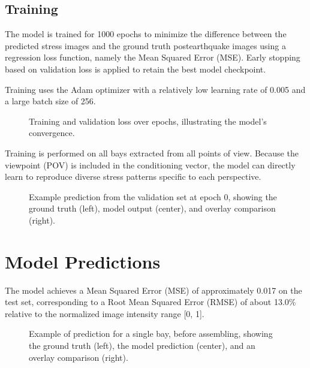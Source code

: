 \documentclass[letterpaper,10pt,english]{sphinxmanual}
\begin{document}
\section{Training}
\label{\detokenize{model:training}}
\sphinxAtStartPar
The model is trained for 1000 epochs to minimize the difference between the
predicted stress images and the ground truth post\sphinxhyphen{}earthquake images using a
regression loss function, namely the Mean Squared Error (MSE).
Early stopping based on validation loss is applied to retain the best model checkpoint.

\sphinxAtStartPar
Training uses the Adam optimizer with a relatively low learning rate of 0.005
and a large batch size of 256.

\begin{figure}[H]
\centering
\capstart

\noindent{}
\caption{Training and validation loss over epochs, illustrating the model’s convergence.}\label{\detokenize{model:id3}}\end{figure}

\sphinxAtStartPar
Training is performed on all bays extracted from all points of view.
Because the viewpoint (POV) is included in the conditioning vector, the model
can directly learn to reproduce diverse stress patterns specific to each
perspective.

\begin{figure}[H]
\centering
\capstart

\noindent{}
\caption{Example prediction from the validation set at epoch 0, showing the ground
truth (left), model output (center), and overlay comparison (right).}\label{\detokenize{model:id4}}\end{figure}

\sphinxstepscope


\chapter{Model Predictions}
\label{\detokenize{predictions:model-predictions}}\label{\detokenize{predictions:prediction-section}}\label{\detokenize{predictions::doc}}
\sphinxAtStartPar
The model achieves a Mean Squared Error (MSE) of approximately 0.017 on the
test set, corresponding to a Root Mean Squared Error (RMSE) of about 13.0\%
relative to the normalized image intensity range {[}0, 1{]}.

\begin{figure}[H]
\centering
\capstart

\noindent{}
\caption{Example of prediction for a single bay, before assembling, showing
the ground truth (left), the model prediction (center), and an overlay
comparison (right).}\label{\detokenize{predictions:id1}}\end{figure}
\end{document}
